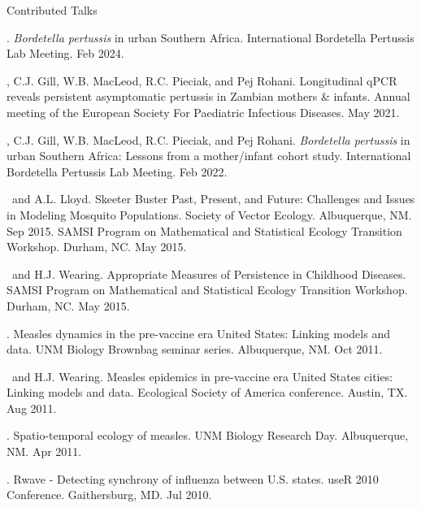 \documentclass{resume} %
\begin{document}
\begin{rSection}{Contributed Talks}
\item \authSelf. \textit{Bordetella pertussis} in urban Southern Africa. International Bordetella Pertussis Lab Meeting. Feb 2024.
\item \authSelf, C.J. Gill, W.B. MacLeod, R.C. Pieciak, and Pej Rohani. Longitudinal qPCR reveals persistent asymptomatic pertussis in Zambian mothers \& infants. Annual meeting of the European Society For Paediatric Infectious Diseases. May 2021.
\item \authSelf, C.J. Gill, W.B. MacLeod, R.C. Pieciak, and Pej Rohani.  \textit{Bordetella pertussis} in urban Southern Africa: Lessons from a mother/infant cohort study. International Bordetella Pertussis Lab Meeting. Feb 2022.
\item \authSelf\ and A.L. Lloyd.  Skeeter Buster Past, Present, and Future: Challenges and Issues in Modeling Mosquito Populations.
Society of Vector Ecology. Albuquerque, NM. Sep 2015.
SAMSI Program on Mathematical and Statistical Ecology Transition Workshop. Durham, NC. May 2015.
\item \authSelf\ and H.J. Wearing.  Appropriate Measures of Persistence in Childhood Diseases.
SAMSI Program on Mathematical and Statistical Ecology Transition Workshop. Durham, NC. May 2015.
\item \authSelf.  Measles dynamics in the pre-vaccine era United States: Linking
models and data. UNM Biology Brownbag seminar series. Albuquerque, NM. Oct 2011.
\item \authSelf\ and H.J. Wearing.  Measles epidemics in pre-vaccine era United States cities: Linking models and data. Ecological Society of America conference. Austin, TX. Aug 2011.
\item \authSelf.  Spatio-temporal ecology of measles. 
UNM Biology Research Day. Albuquerque, NM. Apr 2011.
\item \authSelf. Rwave - Detecting synchrony of influenza between U.S. states.
useR 2010 Conference. Gaithersburg, MD. Jul 2010.
\end{rSection}
\end{document}
